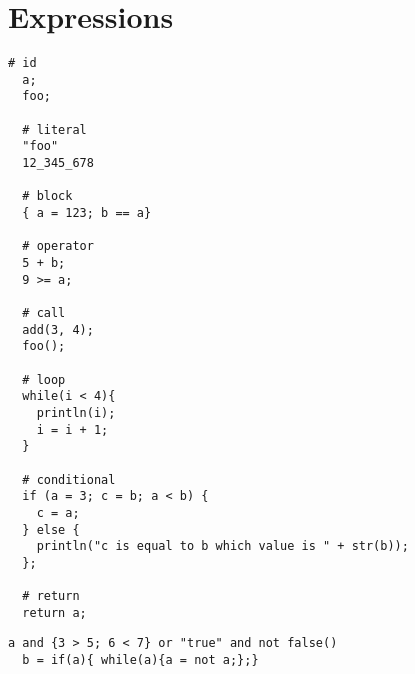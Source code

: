 \chapter{Expressions}

\begin{example}
\begin{lstlisting}[language=intentio]
  # id
  a;
  foo;

  # literal
  "foo"
  12_345_678

  # block
  { a = 123; b == a}

  # operator
  5 + b;
  9 >= a;

  # call
  add(3, 4);
  foo();

  # loop
  while(i < 4){
    println(i); 
    i = i + 1;
  }

  # conditional
  if (a = 3; c = b; a < b) {
    c = a;
  } else {
    println("c is equal to b which value is " + str(b));
  };

  # return
  return a;
\end{lstlisting}
\end{example}

\begin{example}
\begin{lstlisting}[language=intentio]
  a and {3 > 5; 6 < 7} or "true" and not false()
  b = if(a){ while(a){a = not a;};}
\end{lstlisting}
\end{example}

